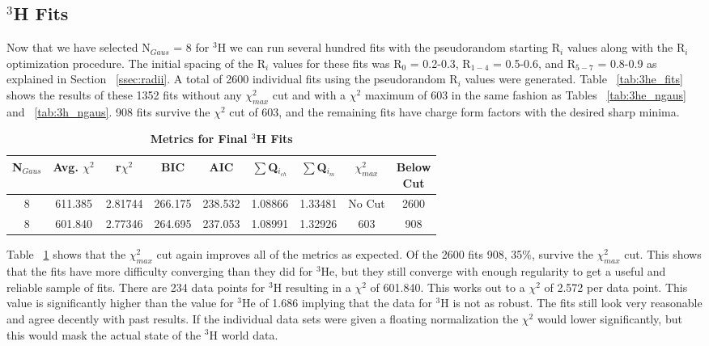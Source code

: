 \subsection{$^3$H Fits}
\label{ssec:3h_fits}

Now that we have selected N$_{Gaus}$ = 8 for $^3$H we can run several hundred fits with the pseudorandom starting R$_i$ values along with the R$_i$ optimization procedure. The initial spacing of the R$_i$ values for these fits was R$_0$ = 0.2-0.3, R$_{1-4}$ = 0.5-0.6, and R$_{5-7}$ = 0.8-0.9 as explained in Section ~\ref{ssec:radii}. A total of 2600 individual fits using the pseudorandom R$_i$ values were generated. Table ~\ref{tab:3he_fits} shows the results of these 1352 fits without any $\chi^2_{max}$ cut and with a $\chi^2$ maximum of 603 in the same fashion as Tables ~\ref{tab:3he_ngaus} and ~\ref{tab:3h_ngaus}. 908 fits survive the $\chi^2$ cut of 603, and the remaining fits have charge form factors with the desired sharp minima.

\begin{table}[!h]
\centering
\begin{tabular}{|c c c c c c c c c|}
\hline
\textbf{N$_{Gaus}$} & \textbf{Avg. $\chi^2$} & \textbf{r$\chi^2$} & \textbf{BIC} & \textbf{AIC} & \textbf{$\sum$Q$_{i_{ch}}$} & \textbf{$\sum$Q$_{i_{m}}$} & \textbf{$\chi^2_{max}$} & \makecell{\textbf{Below}\\ \textbf{Cut}} \\
\hline
8 & 611.385 & 2.81744 & 266.175 & 238.532 & 1.08866 & 1.33481 & No Cut & 2600\\
8 & 601.840 & 2.77346 & 264.695 & 237.053 & 1.08991 & 1.32926 & 603 & 908\\
\hline
\end{tabular}
\caption{\bf{Metrics for Final $^3$H Fits}}
\label{tab:3h_fits}
\end{table}

Table ~\ref{tab:3h_fits} shows that the $\chi^2_{max}$ cut again improves all of the metrics as expected. Of the 2600 fits 908, 35$\%$, survive the $\chi^2_{max}$ cut. This shows that the fits have more difficulty converging than they did for $^3$He, but they still converge with enough regularity to get a useful and reliable sample of fits. There are 234 data points for $^3$H resulting in a $\chi^2$ of 601.840. This works out to a $\chi^2$ of 2.572 per data point. This value is significantly higher than the value for $^3$He of 1.686 implying that the data for $^3$H is not as robust. The fits still look very reasonable and agree decently with past results. If the individual data sets were given a floating normalization the $\chi^2$ would lower significantly, but this would mask the actual state of the $^3$H world data. 

